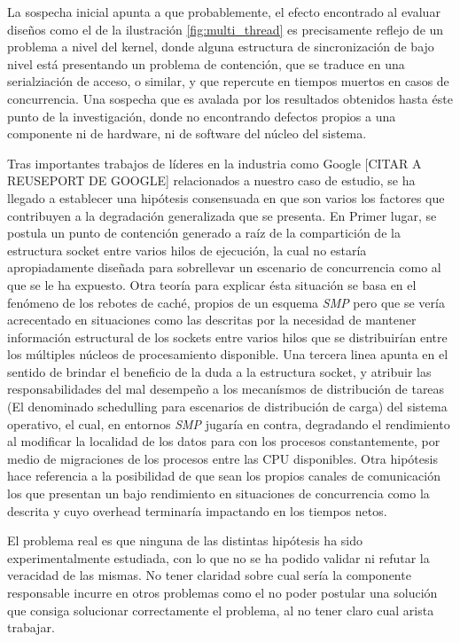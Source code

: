 La sospecha inicial apunta a que probablemente, el efecto encontrado al evaluar diseños como el de la ilustración \ref{fig:multi_thread} es precisamente reflejo de un problema a nivel del kernel, donde alguna estructura de sincronización de bajo nivel está presentando un problema de contención, que se traduce en una serialziación de acceso, o similar, y que repercute en tiempos muertos en casos de concurrencia. Una sospecha que es avalada por los resultados obtenidos hasta éste punto de la investigación, donde no encontrando defectos propios a una componente ni de hardware, ni de software del núcleo del sistema.

Tras importantes trabajos de líderes en la industria como Google [CITAR A REUSEPORT DE GOOGLE] relacionados a nuestro caso de estudio, se ha llegado a establecer una hipótesis consensuada en que son varios los factores que contribuyen a la degradación generalizada que se presenta. En Primer lugar, se postula un punto de contención generado a raíz de la compartición de la estructura socket entre varios hilos de ejecución, la cual no estaría apropiadamente diseñada para sobrellevar un escenario de concurrencia como al que se le ha expuesto. Otra teoría para explicar ésta situación se basa en el fenómeno de los rebotes de caché, propios de un esquema \emph{SMP} pero que se vería acrecentado en situaciones como las descritas por la necesidad de mantener información estructural de los sockets entre varios hilos que se distribuirían entre los múltiples núcleos de procesamiento disponible. Una tercera linea apunta en el sentido de brindar el beneficio de la duda a la estructura socket, y atribuir las responsabilidades del mal desempeño a los mecanísmos de distribución de tareas (El denominado schedulling para escenarios de distribución de carga) del sistema operativo, el cual, en entornos \emph{SMP} jugaría en contra, degradando el rendimiento al modificar la localidad de los datos para con los procesos constantemente, por medio de migraciones de los procesos entre las CPU disponibles. Otra hipótesis hace referencia a la posibilidad de que sean los propios canales de comunicación los que presentan un bajo rendimiento en situaciones de concurrencia como la descrita y cuyo overhead terminaría impactando en los tiempos netos.

El problema real es que ninguna de las distintas hipótesis ha sido experimentalmente estudiada, con lo que no se ha podido validar ni refutar la veracidad de las mismas. No tener claridad sobre cual sería la componente responsable incurre en otros problemas como el no poder postular una solución que consiga solucionar correctamente el problema, al no tener claro cual arista trabajar.
